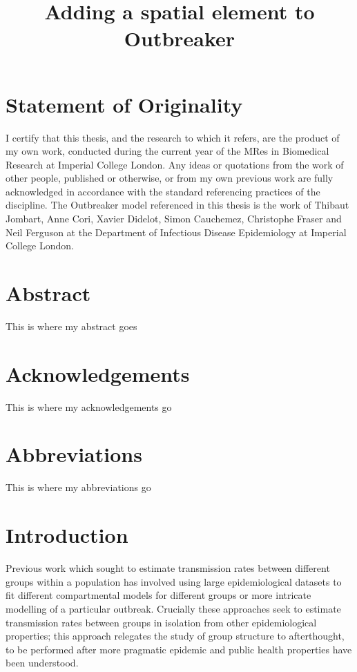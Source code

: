 \documentclass[11pt,a4paper]{report}
\title{Adding a spatial element to Outbreaker}
\begin{document}
\maketitle
\chapter*{Statement of Originality}
\thispagestyle{empty}
\noindent I certify that this thesis, and the research to which it refers, are the product of my own work, conducted during the current year of the MRes in Biomedical Research at Imperial College London. Any ideas or quotations from the work of other people, published or otherwise, or from my own previous work are fully acknowledged in accordance with the standard referencing practices of the discipline. The Outbreaker model referenced in this thesis is the work of Thibaut Jombart, Anne Cori, Xavier Didelot, Simon Cauchemez, Christophe Fraser and Neil Ferguson at the Department of Infectious Disease Epidemiology at Imperial College London.
\newpage

\chapter*{Abstract}
\thispagestyle{empty}
This is where my abstract goes
\newpage

\chapter*{Acknowledgements}
\thispagestyle{empty}
This is where my acknowledgements go
\newpage

\tableofcontents
\pagestyle{plain}
\newpage

\chapter*{Abbreviations}
\thispagestyle{empty}
This is where my abbreviations go
\newpage


\chapter{Introduction}
Previous work which sought to estimate transmission rates between different groups within a population has involved using large epidemiological datasets to fit different compartmental models for different groups or more intricate modelling of a particular outbreak. Crucially these approaches seek to estimate transmission rates between groups in isolation from other epidemiological properties; this approach relegates the study of group structure to afterthought, to be performed after more pragmatic epidemic and public health properties have been understood.
\end{document}
